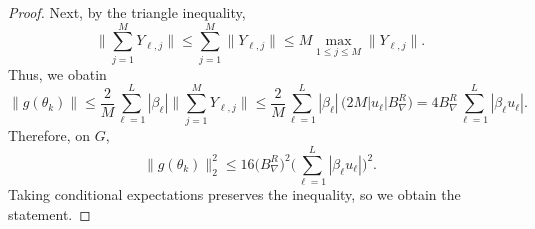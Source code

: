 \documentclass[reqno, 11pt]{amsart}%
\newcommand\cG{\mathcal G}
\theoremstyle{definition}
\begin{document}
\begin{proof}
Next, by the triangle inequality,
\[
\Big\|\sum_{j=1}^M Y_{\ell,j}\Big\|
\le \sum_{j=1}^M \|Y_{\ell,j}\|
\le M \max_{1\le j\le M}\|Y_{\ell,j}\|.
\]
Thus, we obatin
\[
\|g(\theta_k)\|
\le \frac{2}{M}\sum_{\ell=1}^{L}|\beta_\ell|
\Big\|\sum_{j=1}^M Y_{\ell,j}\Big\|
\le \frac{2}{M}\sum_{\ell=1}^{L}|\beta_\ell|\,
\Big(2M|u_\ell|B_\nabla^R\Big)
=4B_\nabla^R\sum_{\ell=1}^{L}|\beta_\ell u_\ell|.
\]
Therefore, on $G$,
\begin{equation}\label{eq:g-det-bound}
\|g(\theta_k)\|_2^2
\le 16\big(B_\nabla^R\big)^2
\Big(\sum_{\ell=1}^{L}|\beta_\ell u_\ell|\Big)^2.
\end{equation}
Taking conditional expectations preserves the inequality, so we obtain the statement.
\end{proof}



 
\end{document}

